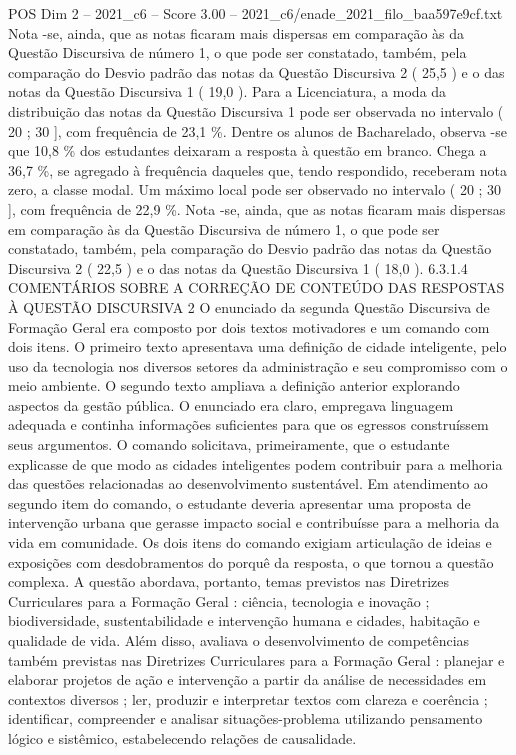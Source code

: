 \begin{textsample}{POS Dim 2 – 2021\_c6 – Score 3.00 – 2021\_c6/enade\_2021\_filo\_baa597e9cf.txt}
Nota -se, ainda, que as notas ficaram mais dispersas em comparação às da Questão Discursiva de número 1, o que pode ser constatado, também, pela comparação do Desvio padrão das notas da Questão Discursiva 2 ( 25,5 ) e o das notas da Questão Discursiva 1 ( 19,0 ).
Para a Licenciatura, a moda da distribuição das notas da Questão Discursiva 1 pode ser observada no intervalo ( 20 ; 30 ], com frequência de 23,1 \%.
Dentre os alunos de Bacharelado, observa -se que 10,8 \% dos estudantes deixaram a resposta à questão em branco.
Chega a 36,7 \%, se agregado à frequência daqueles que, tendo respondido, receberam nota zero, a classe modal.
Um máximo local pode ser observado no intervalo ( 20 ; 30 ], com frequência de 22,9 \%.
Nota -se, ainda, que as notas ficaram mais dispersas em comparação às da Questão Discursiva de número 1, o que pode ser constatado, também, pela comparação do Desvio padrão das notas da Questão Discursiva 2 ( 22,5 ) e o das notas da Questão Discursiva 1 ( 18,0 ). 6.3.1.4 COMENTÁRIOS SOBRE A CORREÇÃO DE CONTEÚDO DAS RESPOSTAS À QUESTÃO DISCURSIVA 2 O enunciado da segunda Questão Discursiva de Formação Geral era composto por dois textos motivadores e um comando com dois itens.
O primeiro texto apresentava uma definição de cidade inteligente, pelo uso da tecnologia nos diversos setores da administração e seu compromisso com o meio ambiente.
O segundo texto ampliava a definição anterior explorando aspectos da gestão pública.
O enunciado era claro, empregava linguagem adequada e continha informações suficientes para que os egressos construíssem seus argumentos.
O comando solicitava, primeiramente, que o estudante explicasse de que modo as cidades inteligentes podem contribuir para a melhoria das questões relacionadas ao desenvolvimento sustentável.
Em atendimento ao segundo item do comando, o estudante deveria apresentar uma proposta de intervenção urbana que gerasse impacto social e contribuísse para a melhoria da vida em comunidade.
Os dois itens do comando exigiam articulação de ideias e exposições com desdobramentos do porquê da resposta, o que tornou a questão complexa.
A questão abordava, portanto, temas previstos nas Diretrizes Curriculares para a Formação Geral : ciência, tecnologia e inovação ; biodiversidade, sustentabilidade e intervenção humana e cidades, habitação e qualidade de vida.
Além disso, avaliava o desenvolvimento de competências também previstas nas Diretrizes Curriculares para a Formação Geral : planejar e elaborar projetos de ação e intervenção a partir da análise de necessidades em contextos diversos ; ler, produzir e interpretar textos com clareza e coerência ; identificar, compreender e analisar situações-problema utilizando pensamento lógico e sistêmico, estabelecendo relações de causalidade.

\end{textsample}
